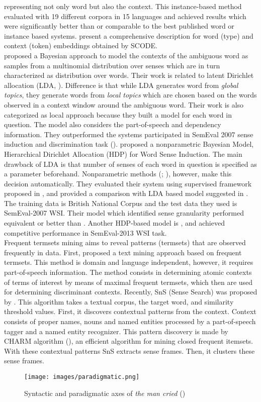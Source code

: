 representing not only word but also the context. This instance-based method evaluated with 19 different corpora in 15 languages and achieved results which were significantly better than or comparable to the best
published word or instance based systems. \cite{sert2013word} present a comprehensive description for word (type) and context (token) embeddings obtained by SCODE. \\


\cite{brody09bayesian} proposed a Bayesian approach to model the contexts of the ambiguous word as samples from a multinomial distribution over senses which are in turn characterized as distribution over words. Their work is related to latent Dirichlet allocation (LDA, \cite{blei03latent}). Difference is that while LDA generates word from \emph{global topics}, they generate words from \emph{local topics} which are chosen based on the words observed in a context window around the ambiguous word. Their work is also categorized as local approach because they built a model for each word in question. The model also considers the part-of-speech and dependency information. They outperformed the systems participated in SemEval 2007 sense induction and discrimination task (\cite{agirre07semeval}). \cite{yao11nonparametric} proposed a nonparametric Bayesian Model, Hierarchical Dirichlet Allocation (HDP) for Word Sense Induction. The main drawback of LDA is that number of senses of each word in question is specified as a parameter beforehand. Nonparametric methods (\cite{reisinger2010mixture}; \cite{vlachos2009unsupervised}), however, make this decision automatically. They evaluated their system using supervised framework proposed in \cite{agirre07semeval}, and provided a comparison with LDA based model suggested in \cite{brody09bayesian}. The training data is British National Corpus \cite{clear1993british} and the test data they used is SemEval-2007 WSI. Their model which identified sense granularity  performed equivalent or better than \cite{brody09bayesian}. Another HDP-based model is \cite{lau13word}, and achieved competitive performance in SemEval-2013 WSI task. \\

Frequent termsets mining aims to reveal patterns (termsets) that are observed frequently in data. First, \cite{rybinski2008discovering} proposed a text mining approach based on frequent termsets. This method is domain and language independent, however, it requires part-of-speech information. The method consists in determining atomic contexts of
terms of interest by means of maximal frequent termsets, which then are used for determining discriminant contexts. Recently, SnS (Sense Search) was proposed by \cite{kozlowski2014sns}. This algorithm takes a textual corpus, the target word, and similarity threshold values. First, it discovers contextual patterns from the context. Context consists of proper names, nouns and named entities processed by a part-of-speech tagger and a named entity recognizer. This pattern discovery is made by CHARM algorithm (\cite{zaki2002charm}), an efficient algorithm for mining closed frequent itemsets. With these contextual patterns SnS extracts sense frames. Then, it clusters these sense frames.

\begin{figure}
\centering
  \texttt{[image: images/paradigmatic.png]}
  \caption[Syntactic and paradigmatic axes]{Syntactic and paradigmatic axes of \emph{the man cried} (\cite{chandler2007semiotics})}
  \label{fig:paradigmatic}
\end{figure}


